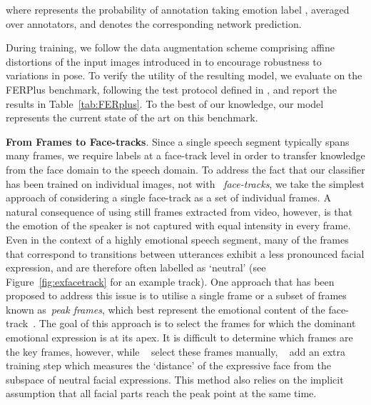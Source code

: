\documentclass[sigconf]{acmart}
\begin{document}
where  represents the probability of annotation  taking emotion label , averaged over annotators, and  denotes the corresponding network prediction.

During training, we follow the data augmentation scheme comprising affine distortions of the input images introduced in \cite{yu2015image} to encourage robustness to variations in pose.  To verify the utility of the resulting model, we evaluate on the FERPlus benchmark,  following the test protocol defined in \cite{BarsoumICMI2016},  and report the results in Table~\ref{tab:FERplus}. To the best of our knowledge, our model represents the current state of the art on this benchmark.

\noindent \textbf{From Frames to Face-tracks}. Since a single speech segment typically spans many frames, we require labels at a face-track level in order to transfer knowledge from the face domain to the speech domain.  To address the fact that our classifier has been trained on individual images, not with ~\textit{face-tracks}, we take the simplest approach of considering a single face-track as a set of individual frames. A natural consequence of using still frames extracted from video, however, is that the emotion of the speaker is not captured with equal intensity in every frame.  Even in the context of a highly emotional speech segment, many of the frames that correspond to transitions between utterances exhibit a less pronounced facial expression, and are therefore often labelled as `neutral' (see Figure~\ref{fig:exfacetrack} for an example track). One approach that has been proposed to address this issue is to utilise a single frame or a subset of frames known as~\textit{peak frames}, which best represent the emotional content of the face-track~\cite{zhalehpour2016multimodal,poria2015towards}. The goal of this approach is to select the frames for which the dominant emotional expression is at its apex. It is difficult to determine which frames are the key frames, however, while ~\cite{poria2015towards} select these frames manually, ~\cite{zhalehpour2016multimodal} add an extra training step which measures the `distance' of the expressive face from the subspace of neutral facial expressions. This method also relies on the implicit assumption that all facial parts reach the peak point at the same time.
\end{document}

